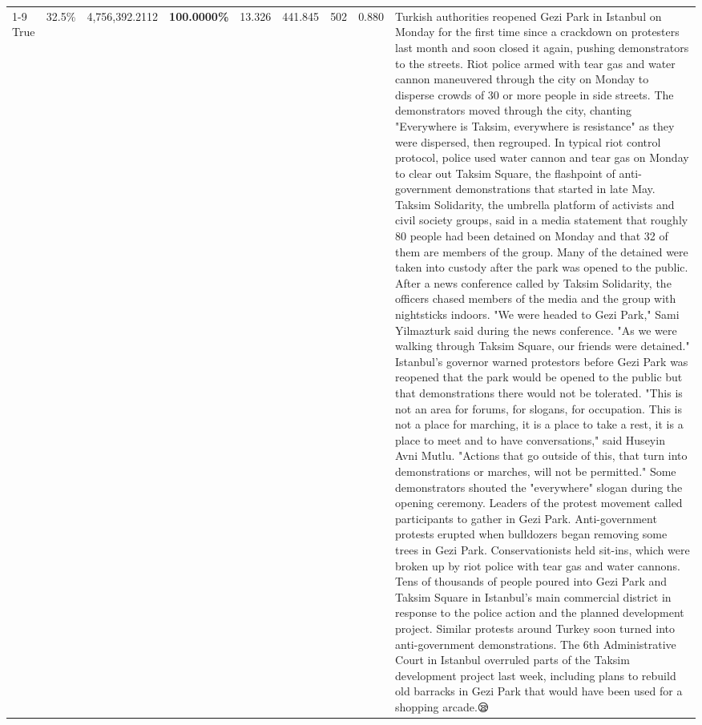 \begin{table}[H]
\begin{tabular}{lllrlllll}
\cline{1-9}
True & 32.5\% & 4,756,392.2112 & \bfseries \color{red} 100.0000\% & 13.326 & 441.845 & 502 & 0.880 & Turkish authorities reopened Gezi Park in Istanbul on Monday for the first time since a crackdown on protesters last month and soon closed it again, pushing demonstrators to the streets. Riot police armed with tear gas and water cannon maneuvered through the city on Monday to disperse crowds of 30 or more people in side streets. The demonstrators moved through the city, chanting "Everywhere is Taksim, everywhere is resistance" as they were dispersed, then regrouped. In typical riot control protocol, police used water cannon and tear gas on Monday to clear out Taksim Square, the flashpoint of anti-government demonstrations that started in late May. Taksim Solidarity, the umbrella platform of activists and civil society groups, said in a media statement that roughly 80 people had been detained on Monday and that 32 of them are members of the group. Many of the detained were taken into custody after the park was opened to the public. After a news conference called by Taksim Solidarity, the officers chased members of the media and the group with nightsticks indoors. "We were headed to Gezi Park," Sami Yilmazturk said during the news conference. "As we were walking through Taksim Square, our friends were detained." Istanbul's governor warned protestors before Gezi Park was reopened that the park would be opened to the public but that demonstrations there would not be tolerated. "This is not an area for forums, for slogans, for occupation. This is not a place for marching, it is a place to take a rest, it is a place to meet and to have conversations," said Huseyin Avni Mutlu. "Actions that go outside of this, that turn into demonstrations or marches, will not be permitted." Some demonstrators shouted the "everywhere" slogan during the opening ceremony. Leaders of the protest movement called participants to gather in Gezi Park. Anti-government protests erupted when bulldozers began removing some trees in Gezi Park. Conservationists held sit-ins, which were broken up by riot police with tear gas and water cannons. Tens of thousands of people poured into Gezi Park and Taksim Square in Istanbul's main commercial district in response to the police action and the planned development project. Similar protests around Turkey soon turned into anti-government demonstrations. The 6th Administrative Court in Istanbul overruled parts of the Taksim development project last week, including plans to rebuild old barracks in Gezi Park that would have been used for a shopping arcade.😪 \\

\end{tabular}
\end{table}
